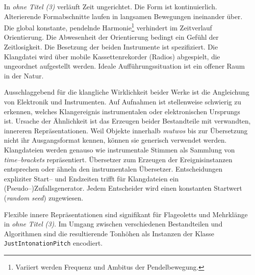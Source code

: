 \documentclass[12pt,a4paper,ngerman]{article}
\begin{document}
\smallskip

In \emph{ohne Titel (3)} verläuft Zeit ungerichtet.
Die Form ist kontinuierlich.
Alterierende Formabschnitte laufen in langsamen Bewegungen ineinander über.
Die global konstante, pendelnde Harmonie\footnote{%
    Variiert werden Frequenz und Ambitus der Pendelbewegung.
} verhindert im Zeitverlauf Orientierung.
Die Abwesenheit der Orientierung bedingt ein Gefühl der Zeitlosigkeit.
Die Besetzung der beiden Instrumente ist spezifiziert.
Die Klangdatei wird über mobile Kassettenrekorder (Radios) abgespielt, die ungeordnet aufgestellt werden.
Ideale Aufführungssituation ist ein offener Raum in der Natur.

\bigskip

Ausschlaggebend für die klangliche Wirklichkeit beider Werke ist die Angleichung von Elektronik und Instrumenten.
Auf Aufnahmen ist stellenweise schwierig zu erkennen, welches Klangereignis instrumentalen oder elektronischen Ursprungs ist.
Ursache der Ähnlichkeit ist das Erzeugen beider Bestandteile mit verwandten, innereren Repräsentationen.
Weil Objekte innerhalb \emph{mutwos} bis zur Übersetzung nicht ihr Ausgangsformat kennen, können sie generisch verwendet werden.
Klangdateien werden genauso wie instrumentale Stimmen als Sammlung von \emph{time--brackets} repräsentiert.
Übersetzer zum Erzeugen der Ereignisinstanzen entsprechen oder ähneln den instrumentalen Übersetzer.
Entscheidungen expliziter Start-- und Endzeiten trifft für Klangdateien ein (Pseudo--)Zufallsgenerator.
Jedem Entscheider wird einen konstanten Startwert (\emph{random seed}) zugewiesen.

\bigskip

Flexible innere Repräsentationen sind signifikant für Flageoletts und Mehrklänge in \emph{ohne Titel (3)}.
Im Umgang zwischen verschiedenen Bestandteilen und Algorithmen sind die resultierende Tonhöhen als Instanzen der Klasse \texttt{JustIntonationPitch} encodiert.

\bigskip
\end{document}
